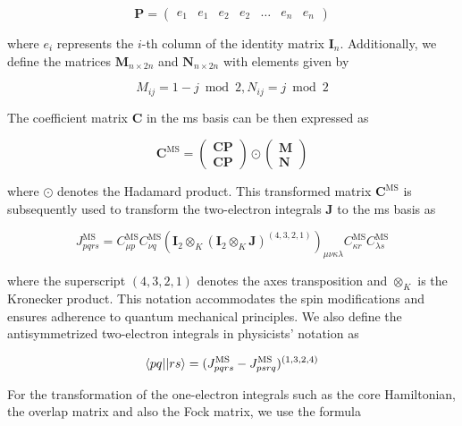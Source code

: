 \begin{equation}
\mathbf{P}=
\begin{pmatrix}
e_1&e_1&e_2&e_2&\dots&e_n&e_n
\end{pmatrix}
\end{equation}

where \(e_i\) represents the \(i\)-th column of the identity matrix \(\mathbf{I}_n\). Additionally, we define the matrices \(\mathbf{M}_{n\times 2n}\) and \(\mathbf{N}_{n\times 2n}\) with elements given by

\begin{equation}
M_{ij}=1-j\bmod 2,N_{ij}=j \bmod 2
\end{equation}

The coefficient matrix \(\mathbf{C}\) in the \acrshort{ms} basis can be then expressed as

\begin{equation}
\mathbf{C}^{\mathrm{MS}}=
\begin{pmatrix}
\mathbf{CP} \\
\mathbf{CP}
\end{pmatrix}
\odot
\begin{pmatrix}
\mathbf{M} \\
\mathbf{N}
\end{pmatrix}
\end{equation}

where \(\odot\) denotes the Hadamard product. This transformed matrix \(\mathbf{C}^{\mathrm{MS}}\) is subsequently used to transform the two-electron integrals \(\mathbf{J}\) to the \acrshort{ms} basis as

\begin{equation}
J_{pqrs}^{\mathrm{MS}}=C_{\mu p}^{\mathrm{MS}}C_{\nu q}^{\mathrm{MS}}(\mathbf{I}_{2}\otimes_K(\mathbf{I}_{2}\otimes_K\mathbf{J})^{(4,3,2,1)})_{\mu\nu\kappa\lambda}C_{\kappa r}^{\mathrm{MS}}C_{\lambda s}^{\mathrm{MS}}
\end{equation}

where the superscript \((4,3,2,1)\) denotes the axes transposition and \(\otimes_K\) is the Kronecker product. This notation accommodates the spin modifications and ensures adherence to quantum mechanical principles. We also define the antisymmetrized two-electron integrals in physicists' notation as

\begin{equation}
\braket{pq||rs}=(J_{pqrs}^{\mathrm{MS}}-J_{psrq}^{\mathrm{MS}})^{(1,3,2,4)}
\end{equation}

For the transformation of the one-electron integrals such as the core Hamiltonian, the overlap matrix and also the Fock matrix, we use the formula

